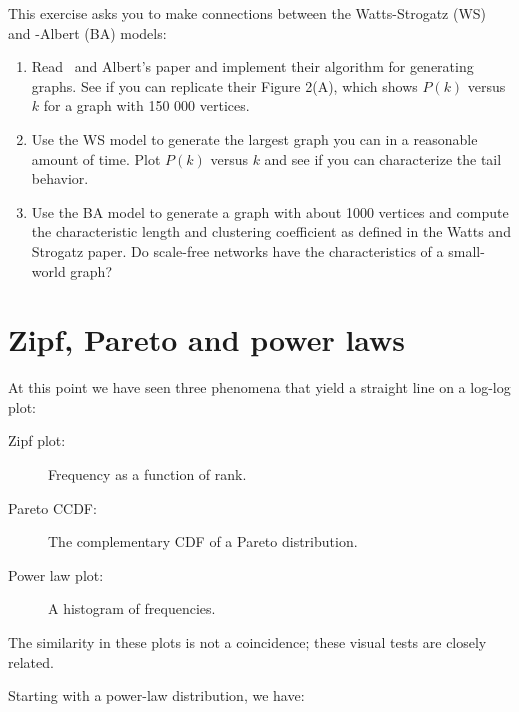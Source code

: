 \documentclass[10pt]{book}
\begin{document}
\begin{ex}

This exercise asks you to make connections between the Watts-Strogatz (WS)
and \Barabasi-Albert (BA) models:

\begin{enumerate}

\item Read \Barabasi~and Albert's paper and implement their algorithm
for generating graphs.  See if you can replicate their Figure 2(A),
which shows $P(k)$ versus $k$ for a graph with 150 000 vertices.

\item Use the WS model to generate the largest graph you can in
a reasonable amount of time.  Plot $P(k)$ versus $k$ and see if
you can characterize the tail behavior.

\item Use the BA model to generate a graph with about 1000 vertices
and compute the characteristic length and clustering coefficient
as defined in the Watts and Strogatz paper.  Do scale-free networks
have the characteristics of a small-world graph?

\end{enumerate}

\end{ex}




\section{Zipf, Pareto and power laws}


At this point we have seen three phenomena that yield a straight line
on a log-log plot:

\begin{description}

\item[Zipf plot:] Frequency as a function of rank. 

\item[Pareto CCDF:] The complementary CDF of a Pareto distribution.

\item[Power law plot:] A histogram of frequencies.

\end{description}

The similarity in these plots is not a coincidence; these
visual tests are closely related.

Starting with a power-law distribution, we have:
\end{document}
